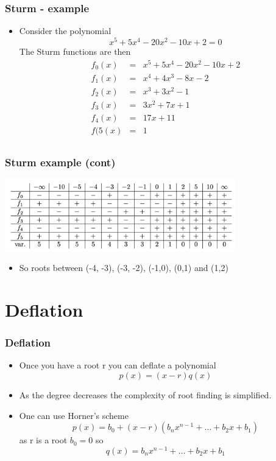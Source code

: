 \documentclass[10pt]{beamer}
\begin{document}
\begin{frame}
  \frametitle{Sturm - example}
  \begin{itemize}
  \item Consider the polynomial
    \[
      x^5 + 5x^4 - 20 x^2 - 10x + 2 =0
    \]
    The Sturm functions are then
    \[
      \begin{array}{rcl}
        f_0(x) & = &  x^5 + 5x^4 - 20 x^2 - 10x + 2\\
        f_1(x) & = &  x^4 + 4 x^3 - 8x - 2\\
        f_2(x) & = &  x^3 + 3 x^2 - 1\\
        f_3(x) & = &  3 x^2 + 7 x +1 \\
        f_4(x) & = &  17x + 11\\
        f(5(x) & = &  1\\
      \end{array}
    \]
  \end{itemize}
\end{frame}

\begin{frame}
  \frametitle{Sturm example (cont)}
  \centerline{\includegraphics[width=10cm]{sturm-figure}}
  \begin{itemize}
  \item So roots between (-4, -3), (-3, -2), (-1,0), (0,1) and (1,2)
  \end{itemize}
\end{frame}


\section{Deflation}

\begin{frame}
  \frametitle{Deflation}
  \begin{itemize}
  \item Once you have a root r you can deflate a polynomial
    \[
      p(x) = (x-r) q(x)
    \]
  \item As the degree decreases the complexity of root finding is simplified. 
  \item One can use Horner's scheme
    \[
      p(x) = b_0 + (x-r)(b_n x^{n-1} + \ldots + b_2 x + b_1)
    \]
    as r is a root $b_0 = 0$ so
    \[
      q(x) = b_n x^{n-1} + \ldots + b_2 x + b_1
    \]
  \end{itemize}
\end{frame}
\end{document}
